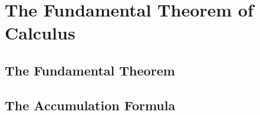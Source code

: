 \chapter{The Fundamental Theorem of Calculus}

\section{The Fundamental Theorem}


\section{The Accumulation Formula}
